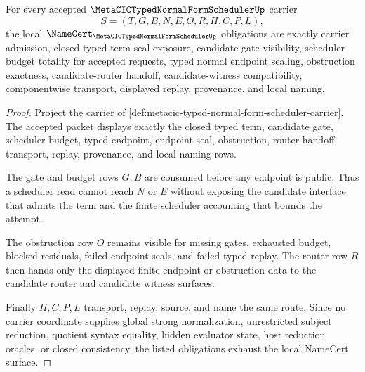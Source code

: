 \begin{theorem}
\label{thm:metacic-typed-normal-form-scheduler-obligations}
For every accepted $\MetaCICTypedNormalFormSchedulerUp$ carrier
$$
S=(T,G,B,N,E,O,R,H,C,P,L),
$$
the local $\NameCert_{\MetaCICTypedNormalFormSchedulerUp}$ obligations are exactly carrier admission, closed typed-term seal exposure, candidate-gate visibility, scheduler-budget totality for accepted requests, typed normal endpoint sealing, obstruction exactness, candidate-router handoff, candidate-witness compatibility, componentwise transport, displayed replay, provenance, and local naming.
\end{theorem}
\begin{proof}
Project the carrier of \autoref{def:metacic-typed-normal-form-scheduler-carrier}. The accepted packet displays exactly the closed typed term, candidate gate, scheduler budget, typed endpoint, endpoint seal, obstruction, router handoff, transport, replay, provenance, and local naming rows.

The gate and budget rows $G,B$ are consumed before any endpoint is public. Thus a scheduler read cannot reach $N$ or $E$ without exposing the candidate interface that admits the term and the finite scheduler accounting that bounds the attempt.

The obstruction row $O$ remains visible for missing gates, exhausted budget, blocked residuals, failed endpoint seals, and failed typed replay. The router row $R$ then hands only the displayed finite endpoint or obstruction data to the candidate router and candidate witness surfaces.

Finally $H,C,P,L$ transport, replay, source, and name the same route. Since no carrier coordinate supplies global strong normalization, unrestricted subject reduction, quotient syntax equality, hidden evaluator state, host reduction oracles, or closed consistency, the listed obligations exhaust the local NameCert surface.
\end{proof}

